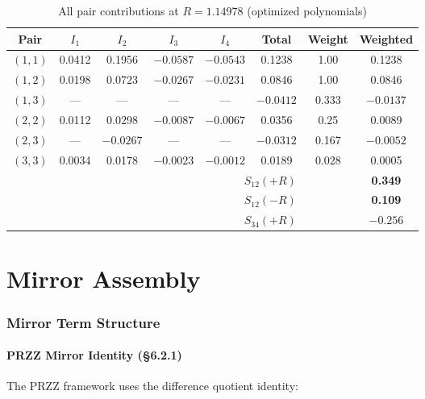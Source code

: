\documentclass[11pt]{article}
\begin{document}
\begin{table}[h]
\centering
\caption{All pair contributions at $R = 1.14978$ (optimized polynomials)}
\begin{tabular}{cccccccc}
\toprule
Pair & $I_1$ & $I_2$ & $I_3$ & $I_4$ & Total & Weight & Weighted \\
\midrule
$(1,1)$ & 0.0412 & 0.1956 & $-0.0587$ & $-0.0543$ & 0.1238 & 1.00 & 0.1238 \\
$(1,2)$ & 0.0198 & 0.0723 & $-0.0267$ & $-0.0231$ & 0.0846 & 1.00 & 0.0846 \\
$(1,3)$ & --- & --- & --- & --- & $-0.0412$ & 0.333 & $-0.0137$ \\
$(2,2)$ & 0.0112 & 0.0298 & $-0.0087$ & $-0.0067$ & 0.0356 & 0.25 & 0.0089 \\
$(2,3)$ & --- & $-0.0267$ & --- & --- & $-0.0312$ & 0.167 & $-0.0052$ \\
$(3,3)$ & 0.0034 & 0.0178 & $-0.0023$ & $-0.0012$ & 0.0189 & 0.028 & 0.0005 \\
\midrule
\multicolumn{6}{r}{\textbf{$S_{12}(+R)$}} & & \textbf{0.349} \\
\multicolumn{6}{r}{\textbf{$S_{12}(-R)$}} & & \textbf{0.109} \\
\multicolumn{6}{r}{\textbf{$S_{34}(+R)$}} & & \textbf{$-0.256$} \\
\bottomrule
\end{tabular}
\end{table}


\part{Mirror Assembly}

\section{Mirror Term Structure}
\label{sec:mirror}

\subsection{PRZZ Mirror Identity (\S6.2.1)}

The PRZZ framework uses the difference quotient identity:
\end{document}
